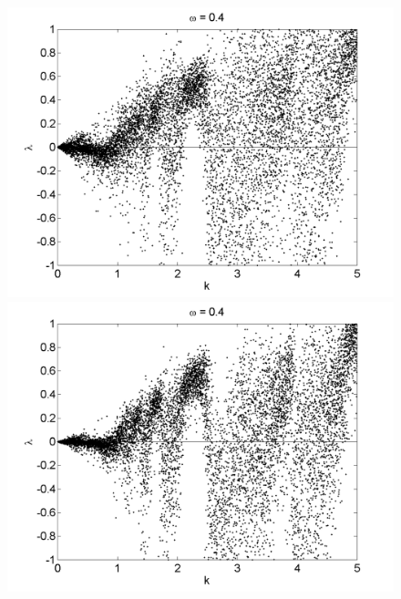 \begin{figure}[!h]
\includegraphics[width=.5\textwidth]{figs/rcirc_n_lyap_halfa10000_L_05_w_04_k.png}\hfill
\includegraphics[width=.5\textwidth]{figs/rcirc_n_lyap_halfa10000_L_07_w_04_k.png}\\
\end{figure}



